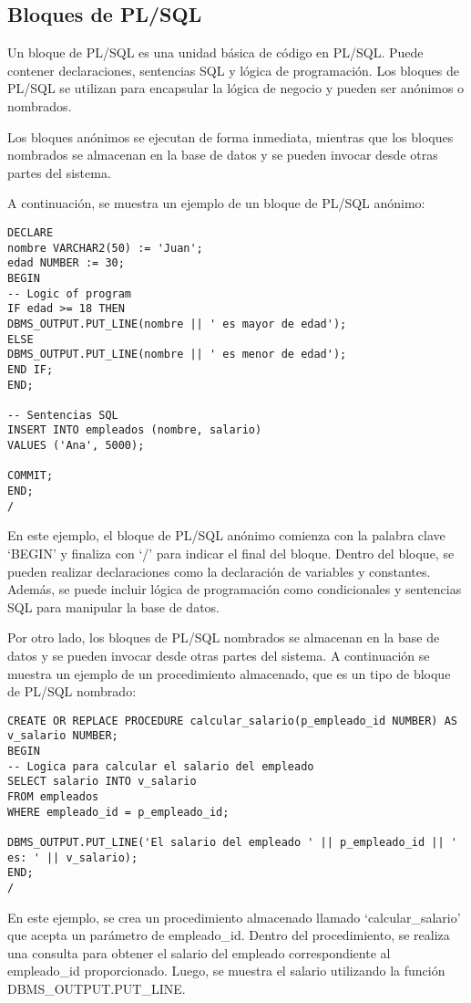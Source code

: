 \documentclass[executivepaper]{article}
\begin{document}
\subsection{Bloques de PL/SQL}
Un bloque de PL/SQL es una unidad básica de código en PL/SQL. Puede contener declaraciones, sentencias SQL y lógica de programación. Los bloques de PL/SQL se utilizan para encapsular la lógica de negocio y pueden ser anónimos o nombrados.

Los bloques anónimos se ejecutan de forma inmediata, mientras que los bloques nombrados se almacenan en la base de datos y se pueden invocar desde otras partes del sistema.

A continuación, se muestra un ejemplo de un bloque de PL/SQL anónimo:

\begin{lstlisting}
DECLARE
nombre VARCHAR2(50) := 'Juan';
edad NUMBER := 30;
BEGIN
-- Logic of program
IF edad >= 18 THEN
DBMS_OUTPUT.PUT_LINE(nombre || ' es mayor de edad');
ELSE
DBMS_OUTPUT.PUT_LINE(nombre || ' es menor de edad');
END IF;
END;

-- Sentencias SQL
INSERT INTO empleados (nombre, salario)
VALUES ('Ana', 5000);

COMMIT;
END;
/
\end{lstlisting}

En este ejemplo, el bloque de PL/SQL anónimo comienza con la palabra clave \enquote*{BEGIN} y finaliza con \enquote*{/} para indicar el final del bloque. Dentro del bloque, se pueden realizar declaraciones como la declaración de variables y constantes. Además, se puede incluir lógica de programación como condicionales y sentencias SQL para manipular la base de datos.

Por otro lado, los bloques de PL/SQL nombrados se almacenan en la base de datos y se pueden invocar desde otras partes del sistema. A continuación se muestra un ejemplo de un procedimiento almacenado, que es un tipo de bloque de PL/SQL nombrado:

\begin{lstlisting}
CREATE OR REPLACE PROCEDURE calcular_salario(p_empleado_id NUMBER) AS
v_salario NUMBER;
BEGIN
-- Logica para calcular el salario del empleado
SELECT salario INTO v_salario
FROM empleados
WHERE empleado_id = p_empleado_id;

DBMS_OUTPUT.PUT_LINE('El salario del empleado ' || p_empleado_id || ' es: ' || v_salario);
END;
/
\end{lstlisting}

En este ejemplo, se crea un procedimiento almacenado llamado \enquote*{calcular\_salario} que acepta un parámetro de empleado\_id. Dentro del procedimiento, se realiza una consulta para obtener el salario del empleado correspondiente al empleado\_id proporcionado. Luego, se muestra el salario utilizando la función DBMS\_OUTPUT.PUT\_LINE.
\end{document}
